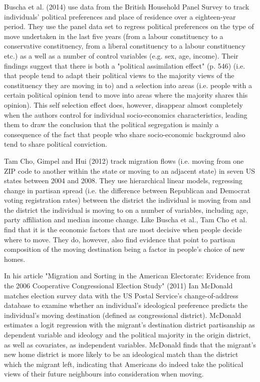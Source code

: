 \documentclass[12pt, a4paper]{article}
\begin{document}
	Buscha et al. (2014) use data from the British Household Panel Survey to track individuals' political preferences and place of residence over a eighteen-year period. They use the panel data set to regress political preferences on the type of move undertaken in the last five years (from a labour constituency to a conservative constituency, from a liberal constituency to a labour constituency etc.) as a well as a number of control variables (e.g. sex, age, income). Their findings suggest that there is both a "political assimilation effect" (p. 546) (i.e. that people tend to adapt their political views to the majority views of the constituency they are moving in to) and a selection into areas (i.e. people with a certain political opinion tend to move into areas where the majority shares this opinion). This self selection effect does, however, disappear almost completely when the authors control for individual socio-economics characteristics, leading them to draw the conclusion that the political segregation is mainly a consequence of the fact that people who share socio-economic background also tend to share  political conviction.   
	
	Tam Cho, Gimpel and Hui (2012) track migration flows (i.e. moving from one ZIP code to another within the state or moving to an adjacent state) in seven US states between 2004 and 2008. They use hierarchical linear models, regressing change in partisan spread (i.e. the difference between Republican and Democrat voting registration rates) between the district the individual is moving from and the district the individual is moving to on a number of variables, including age, party affiliation and median income change. Like Buscha et al., Tam Cho et al. find that it is the economic factors that are most decisive when people decide where to move. They do, however, also find evidence that point to partisan composition of the moving destination being a factor in people's choice of new homes. 
	
	In his article "Migration and Sorting in the American Electorate: Evidence from the 2006 Cooperative Congressional Election Study" (2011) Ian McDonald matches election survey data with the US Postal Service's change-of-address database to examine whether an individual's ideological preference predicts the individual's moving destination (defined as congressional district). McDonald estimates a logit regression with the migrant's destination district partisanship as dependent variable and ideology and the political majority in the origin district, as well as covariates, as independent variables. McDonald finds that the migrant's new home district is more likely to be an ideological match than the district which the migrant left, indicating that Americans do indeed take the political views of their future neighbours into consideration when moving. 
	
\end{document}
